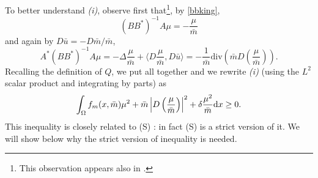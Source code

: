 \documentclass[10pt,a4paper,nouppercase,nowrite]{article}
\numberwithin{equation}{section}
\newcommand{\di}{{\rm d}}
\newcommand{\Sp}{{\textsc (S)} }
\theoremstyle{definition}
\begin{document}
	To better understand \textit{(i)}, observe first that\footnote{This observation appears also in \cite{CLLP2}.}, by \eqref{bbking},
	\[
	(BB^{*})^{-1} A \mu = -\frac\mu{\bar m}
	\]
	and again by  $D \bar u = - D \bar m / \bar m$, 
	\begin{equation*}
		A^{*} (BB^{*})^{-1} A \mu = - \Delta \frac\mu{\bar m} + \langle D\frac\mu{\bar m},D\bar{u} \rangle
		= -\frac{1}{\bar{m}} \text{div} \left( \bar{m} D\left( \frac{\mu}{\bar{m}} \right) \right).
	\end{equation*}
%	
%	
%	
	Recalling the definition of $Q$, we put all together and we rewrite \textit{(i)} (using the $L^2$ scalar product and integrating by parts) as
	\begin{equation*}
		\int_{\Omega} f_m(x,\bar{m})\mu^2 + \bar{m} \left| D \left( \frac{\mu}{\bar{m}} \right) \right|^2 +\delta \frac{\mu^2}{\bar{m}} \di x \geq 0.
	\end{equation*}
This inequality is closely related to \Sp: in fact \Sp is a strict version of it. We will show below why the strict version of inequality is needed.
	
\end{document}
